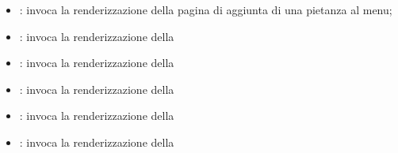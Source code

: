 \begin{itemize}
	\item {}: invoca la renderizzazione della pagina di aggiunta di una pietanza al menu;
	\item {}: invoca la renderizzazione della 
	\item {}: invoca la renderizzazione della 
	\item {}: invoca la renderizzazione della 
	\item {}: invoca la renderizzazione della 
	\item {}: invoca la renderizzazione della 
	
\end{itemize}